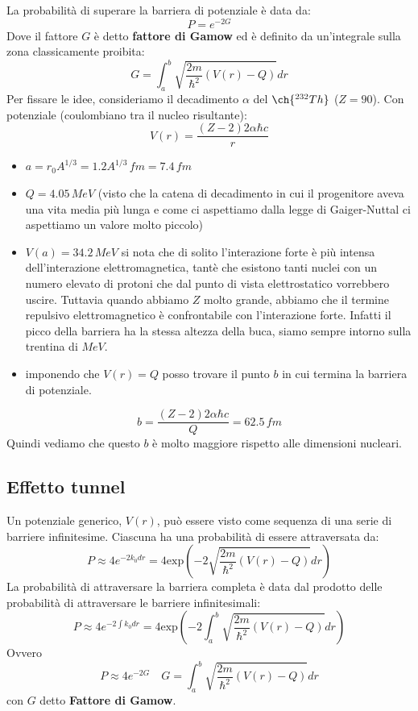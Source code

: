 La probabilità di superare la barriera di potenziale è data da:
\begin{equation*}
    P=e^{-2G}
\end{equation*}
Dove il fattore $G$ è detto \textbf{fattore di Gamow} ed è definito da un'integrale sulla zona classicamente proibita:
\begin{equation*}
    G=\int_a^b\sqrt{\frac{2m}{\hbar^2}(V(r)-Q)}dr
\end{equation*}
Per fissare le idee, consideriamo il decadimento $\alpha$ del $\ch{^{232}Th}$ ($Z=90$). Con potenziale (coulombiano tra il nucleo risultante):
\begin{equation*}
    V(r)=\frac{(Z-2)2\alpha\hbar c}{r}
\end{equation*}
\begin{itemize}
    \item $a=r_0A^{1/3}=1.2A^{1/3}\,fm=7.4\,fm$
    \item $Q=4.05\,MeV$ (visto che la catena di decadimento in cui il progenitore aveva una vita media più lunga e come ci aspettiamo dalla legge di Gaiger-Nuttal ci aspettiamo un valore molto piccolo)
    \item $V(a)=34.2\,MeV$ si nota che di solito l'interazione forte è più intensa dell'interazione elettromagnetica, tantè che esistono tanti nuclei con un numero elevato di protoni che dal punto di vista elettrostatico vorrebbero uscire. Tuttavia quando abbiamo $Z$ molto grande, abbiamo che il termine repulsivo elettromagnetico è confrontabile con l'interazione forte. Infatti il picco della barriera ha la stessa altezza della buca, siamo sempre intorno sulla trentina di $MeV$.
    \item imponendo che $V(r)=Q$ posso trovare il punto $b$ in cui termina la barriera di potenziale.
\end{itemize}
\begin{equation*}
    b=\frac{(Z-2)2\alpha\hbar c}{Q} =62.5\,fm
\end{equation*}
Quindi vediamo che questo $b$ è molto maggiore rispetto alle dimensioni nucleari.
\subsection{Effetto tunnel}
Un potenziale generico, $V(r)$, può essere visto come sequenza di una serie di barriere infinitesime. Ciascuna ha una probabilità di essere attraversata da:
\begin{equation*}
    P\approx4e^{-2k_0dr}=4\text{exp}\left(-2\sqrt{\frac{2m}{\hbar^2}(V(r)-Q)}dr\right)
\end{equation*}
La probabilità di attraversare la barriera completa è data dal prodotto delle probabilità di attraversare le barriere infinitesimali:
\begin{equation*}
    P\approx4e^{-2\int k_0dr}=4\text{exp}\left(-2\int_a^b\sqrt{\frac{2m}{\hbar^2}(V(r)-Q)}dr\right)
\end{equation*}
Ovvero
\begin{equation*}
    P\approx4e^{-2G} \quad G=\int_a^b\sqrt{\frac{2m}{\hbar^2}(V(r)-Q)}dr
\end{equation*}
con $G$ detto \textbf{Fattore di Gamow}.
